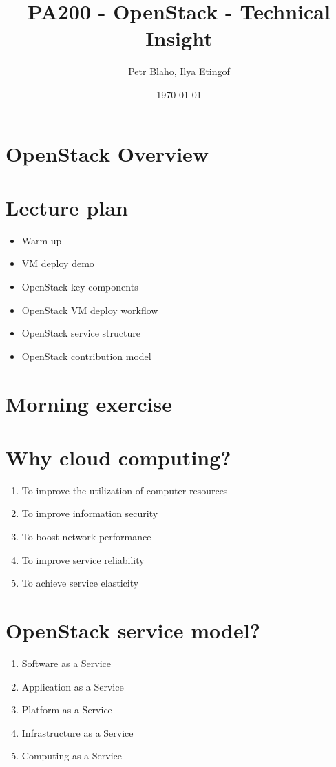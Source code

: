 \documentclass[11pt]{article}
\author{Petr Blaho, Ilya Etingof}
\date{\today}
\title{PA200 - OpenStack - Technical Insight}
\begin{document}
\maketitle

\section*{OpenStack Overview}
\label{sec:orgfc9bd33}

\section*{Lecture plan}
\label{sec:org5f33f2e}
\begin{itemize}
\item Warm-up
\item VM deploy demo
\item OpenStack key components
\item OpenStack VM deploy workflow
\item OpenStack service structure
\item OpenStack contribution model
\end{itemize}

\section*{Morning exercise}
\label{sec:orgffb78d5}

\section*{Why cloud computing?}
\label{sec:orgbe609be}
\begin{enumerate}
\item To improve the utilization of computer resources
\item To improve information security
\item To boost network performance
\item To improve service reliability
\item To achieve service elasticity
\end{enumerate}

\section*{OpenStack service model?}
\label{sec:orgfa463af}
\begin{enumerate}
\item Software as a Service
\item Application as a Service
\item Platform as a Service
\item Infrastructure as a Service
\item Computing as a Service
\end{enumerate}
\end{document}
